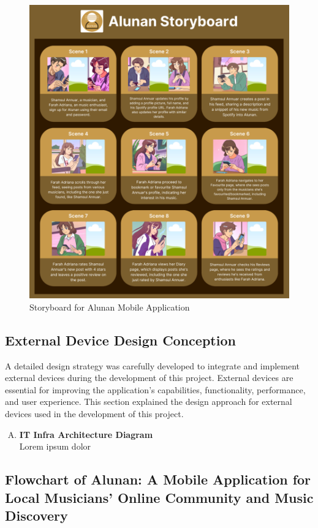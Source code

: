\begin{figure}[h]
    \centering
    \includegraphics[width=1.0\linewidth]{mainmatter/images/storyboard.png}
	\caption{Storyboard for Alunan Mobile Application}
    \label{fig:myfig42}
\end{figure}
\pagebreak

\subsection{External Device Design Conception}
A detailed design strategy was carefully developed to integrate and implement external devices during the development of this project. External devices are essential for improving the application's capabilities, functionality, performance, and user experience. This section explained the design approach for external devices used in the development of this project.
\begin{enumerate}[A.]
    \item \textbf{IT Infra Architecture Diagram} \\
    Lorem ipsum dolor
\end{enumerate}

\subsection{Flowchart of Alunan: A Mobile Application for Local Musicians’ Online Community and Music Discovery}

